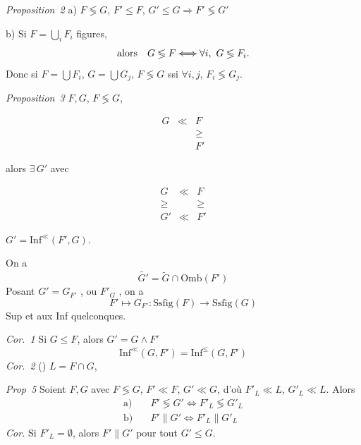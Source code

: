 \documentclass[11pt,a4paper]{article}
\begin{document}

\emph{Proposition~2} a) $F \lessgtr G$, $F' \leq F$, $G' \leq G \Rightarrow F' \lessgtr G'$


b)  Si $F = \bigcup_i F_i$  \ill{} figures,
\[
  \text{alors}\quad G \lessgtr F \;\text{\struck{$\Longleftrightarrow$}}\; \forall i,\ G \lessgtr F_i .
\]
Donc si $F = \bigcup F_i$, $G = \bigcup G_j$, $F \lessgtr G$ ssi $\forall i, j$, $F_i \lessgtr G_j$.


\emph{Proposition~3}   $F, G$, $F \lessgtr G$,  

\[
  \begin{array}{ccc}
    G & \ll & F \\
      &     & \geq \\
      &     & F'
  \end{array}
\]

alors $\exists\, G'$ avec 

\[
  \begin{array}{ccc}
    G  & \ll & F \\
    \geq &   & \geq \\
    G' & \ll & F'
  \end{array}
\]

$G' = \mathrm{Inf}^{\ll}(F', G)$.

On a
\[
  \widetilde{G'} = \widetilde{G} \cap \mathrm{Omb}(F')
\]
Posant $G' = G_{F'}$ , ou $F'_{G}$ , on a
\[
  F' \longmapsto G_{F'} : \mathrm{Ssfig}(F) \longrightarrow \mathrm{Ssfig}(G)
\]
  Sup et aux Inf quelconques.

\emph{Cor.~1} Si $G \leq F$, alors $G' = G \wedge F'$ 
\[
  \mathrm{Inf}^{\ll}(G, F') = \mathrm{Inf}^{\leq}(G, F')
\]
\emph{Cor.~2} () $L = F \cap G$,

\emph{Prop~5} Soient $F, G$ avec $F \lessgtr G$, $F' \ll F$, $G' \ll G$, d'où $F'_{L} \ll L$, $G'_{L} \ll L$. Alors
\struck{\ill{}}
\[
\begin{aligned}
  \text{a)}\quad & F' \lessgtr G' \Longleftrightarrow F'_{L} \lessgtr G'_{L} \\
  \text{b)}\quad & F' \parallel G' \Longleftrightarrow F'_{L} \parallel G'_{L}
\end{aligned}
\]
\emph{Cor.} Si $F'_{L} = \emptyset$, alors $F' \parallel G'$ pour tout $G' \leq G$.
\end{document}

